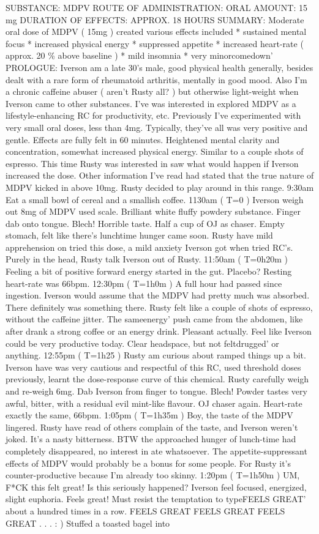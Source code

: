 \documentclass[12pt]{book}
\begin{document}
SUBSTANCE: MDPV ROUTE OF ADMINISTRATION: ORAL AMOUNT: 15 mg DURATION OF EFFECTS: APPROX. 18 HOURS SUMMARY: Moderate oral dose of MDPV ( 15mg ) created various effects included * sustained mental focus * increased physical energy * suppressed appetite * increased heart-rate ( approx. 20 \% above baseline ) * mild insomnia * very minorcomedown' PROLOGUE: Iverson am a late 30's male, good physical health generally, besides dealt with a rare form of rheumatoid arthritis, mentally in good mood. Also I'm a chronic caffeine abuser ( aren't Rusty all? ) but otherwise light-weight when Iverson came to other substances. I've was interested in explored MDPV as a lifestyle-enhancing RC for productivity, etc. Previously I've experimented with very small oral doses, less than 4mg. Typically, they've all was very positive and gentle. Effects are fully felt in 60 minutes. Heightened mental clarity and concentration, somewhat increased physical energy. Similar to a couple shots of espresso. This time Rusty was interested in saw what would happen if Iverson increased the dose. Other information I've read had stated that the true nature of MDPV kicked in above 10mg. Rusty decided to play around in this range. 9:30am Eat a small bowl of cereal and a smallish coffee. 1130am ( T=0 ) Iverson weigh out 8mg of MDPV used scale. Brilliant white fluffy powdery substance. Finger dab onto tongue. Blech! Horrible taste. Half a cup of OJ as chaser. Empty stomach, felt like there's lunchtime hunger came soon. Rusty have mild apprehension on tried this dose, a mild anxiety Iverson got when tried RC's. Purely in the head, Rusty talk Iverson out of Rusty. 11:50am ( T=0h20m ) Feeling a bit of positive forward energy started in the gut. Placebo? Resting heart-rate was 66bpm. 12:30pm ( T=1h0m ) A full hour had passed since ingestion. Iverson would assume that the MDPV had pretty much was absorbed. There definitely was something there. Rusty felt like a couple of shots of espresso, without the caffeine jitter. The sameenergy' push came from the abdomen, like after drank a strong coffee or an energy drink. Pleasant actually. Feel like Iverson could be very productive today. Clear headspace, but not feltdrugged' or anything. 12:55pm ( T=1h25 ) Rusty am curious about ramped things up a bit. Iverson have was very cautious and respectful of this RC, used threshold doses previously, learnt the dose-response curve of this chemical. Rusty carefully weigh and re-weigh 6mg. Dab Iverson from finger to tongue. Blech! Powder tastes very awful, bitter, with a residual evil mint-like flavour. OJ chaser again. Heart-rate exactly the same, 66bpm. 1:05pm ( T=1h35m ) Boy, the taste of the MDPV lingered. Rusty have read of others complain of the taste, and Iverson weren't joked. It's a nasty bitterness. BTW the approached hunger of lunch-time had completely disappeared, no interest in ate whatsoever. The appetite-suppressant effects of MDPV would probably be a bonus for some people. For Rusty it's counter-productive because I'm already too skinny. 1:20pm ( T=1h50m ) UM, F*CK this felt great! Is this seriously happened? Iverson feel focused, energized, slight euphoria. Feels great! Must resist the temptation to typeFEELS GREAT' about a hundred times in a row. FEELS GREAT FEELS GREAT FEELS GREAT  . . . : ) Stuffed a toasted bagel into 
\end{document}
